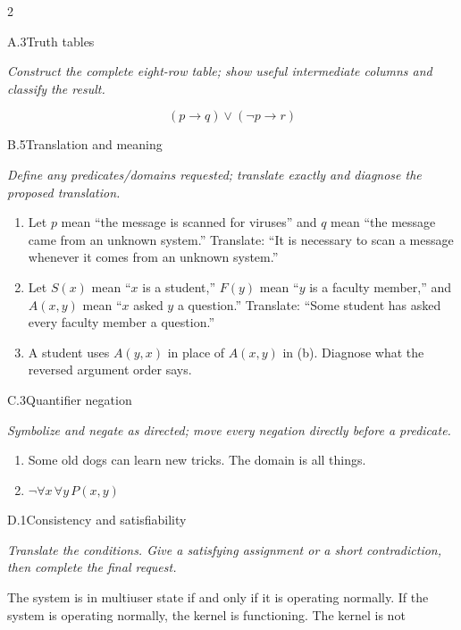 \documentclass[9pt]{extarticle}
\begin{document}
\CoreWorkArea
\FormBreak
{}
\begin{multicols}{2}
\begin{CoreProblem}{A.3}{Truth tables}
{\scriptsize\textit{Construct the complete eight-row table; show useful intermediate columns and classify the result.}\par}
\[
  (p\to q)\lor(\neg p\to r)
\]
\end{CoreProblem}
\begin{CoreProblem}{B.5}{Translation and meaning}
{\scriptsize\textit{Define any predicates/domains requested; translate exactly and diagnose the proposed translation.}\par}
\begin{enumerate}[label=(\alph*)]
  \item Let $p$ mean ``the message is scanned for viruses'' and $q$ mean ``the
        message came from an unknown system.'' Translate: ``It is necessary to
        scan a message whenever it comes from an unknown system.''
  \item Let $S(x)$ mean ``$x$ is a student,'' $F(y)$ mean ``$y$ is a faculty
        member,'' and $A(x,y)$ mean ``$x$ asked $y$ a question.'' Translate:
        ``Some student has asked every faculty member a question.''
  \item A student uses $A(y,x)$ in place of $A(x,y)$ in (b). Diagnose what the
        reversed argument order says.
\end{enumerate}
\end{CoreProblem}
\begin{CoreProblem}{C.3}{Quantifier negation}
{\scriptsize\textit{Symbolize and negate as directed; move every negation directly before a predicate.}\par}
\begin{enumerate}[label=(\alph*)]
  \item Some old dogs can learn new tricks. The domain is all things.
  \item $\neg\forall x\,\forall y\,P(x,y)$
\end{enumerate}
\end{CoreProblem}
\columnbreak
\begin{CoreProblem}{D.1}{Consistency and satisfiability}
{\scriptsize\textit{Translate the conditions. Give a satisfying assignment or a short contradiction, then complete the final request.}\par}
The system is in multiuser state if and only if it is operating normally. If
the system is operating normally, the kernel is functioning. The kernel is not

\end{CoreProblem}
\end{multicols}
\end{document}
